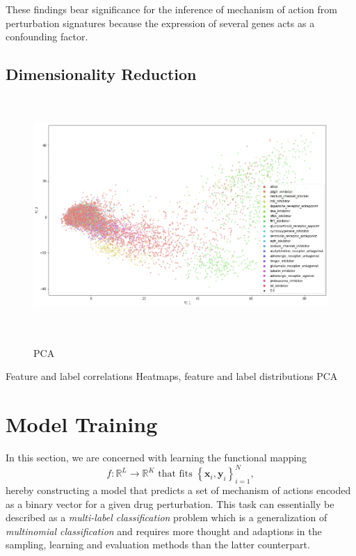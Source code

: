 \documentclass[bsc,frontabs,twoside,singlespacing,parskip,deptreport]{infthesis}     %
\let\Oldsection\section
\renewcommand{\section}{\FloatBarrier\Oldsection}
\begin{document}
These findings bear significance for the inference of mechanism of action from perturbation signatures because the expression of several genes acts as a confounding factor.


\section{Dimensionality Reduction}
\begin{figure}[h!]
\centering
\caption{PCA}
\includegraphics[height=9cm]{images/pca_labelled.png}\label{pca map}
\end{figure}
Feature and label correlations
Heatmaps, feature and label distributions
PCA
\clearpage
\chapter{Model Training}\label{model_training}
In this section, we are concerned with learning the functional mapping \[f: \mathbb{R}^{L} \rightarrow \mathbb{R}^{K} \text { that fits }\left\{\mathbf{x}_{i}, \mathbf{y}_{i}\right\}_{i=1}^{N},\] hereby constructing a model that predicts a set of mechanism of actions encoded as a binary vector for a given drug perturbation. 
This task can essentially be described as a \textit{multi-label classification} problem which is a generalization of \textit{multinomial classification} and requires more thought and adaptions in the sampling, learning and evaluation methods than the latter counterpart.\\
\end{document}
